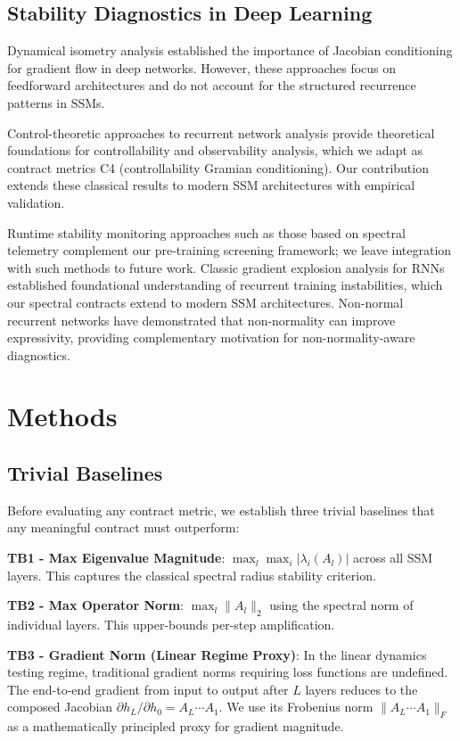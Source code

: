 \documentclass[twoside]{article}
\begin{document}
\subsection{Stability Diagnostics in Deep Learning}

Dynamical isometry analysis \citep{pennington2017resurrecting} established the importance of Jacobian conditioning for gradient flow in deep networks. However, these approaches focus on feedforward architectures and do not account for the structured recurrence patterns in SSMs.

Control-theoretic approaches to recurrent network analysis \citep{sontag1998mathematical} provide theoretical foundations for controllability and observability analysis, which we adapt as contract metrics C4 (controllability Gramian conditioning). Our contribution extends these classical results to modern SSM architectures with empirical validation.

Runtime stability monitoring approaches such as those based on spectral telemetry complement our pre-training screening framework; we leave integration with such methods to future work. Classic gradient explosion analysis for RNNs \citep{pascanu2013difficulty} established foundational understanding of recurrent training instabilities, which our spectral contracts extend to modern SSM architectures. Non-normal recurrent networks \citep{kerg2019nonNormal} have demonstrated that non-normality can improve expressivity, providing complementary motivation for non-normality-aware diagnostics.

\section{Methods}

\subsection{Trivial Baselines}

Before evaluating any contract metric, we establish three trivial baselines that any meaningful contract must outperform:

\textbf{TB1 - Max Eigenvalue Magnitude}: $\max_l \max_i |\lambda_i(A_l)|$ across all SSM layers. This captures the classical spectral radius stability criterion.

\textbf{TB2 - Max Operator Norm}: $\max_l \|A_l\|_2$ using the spectral norm of individual layers. This upper-bounds per-step amplification.

\textbf{TB3 - Gradient Norm (Linear Regime Proxy)}: In the linear dynamics testing regime, traditional gradient norms requiring loss functions are undefined. The end-to-end gradient from input to output after $L$ layers reduces to the composed Jacobian $\partial h_L/\partial h_0 = A_L \cdots A_1$. We use its Frobenius norm $\|A_L \cdots A_1\|_F$ as a mathematically principled proxy for gradient magnitude.
\end{document}
